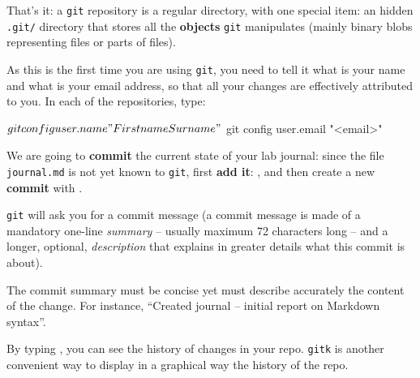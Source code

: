\documentclass{instructions}
\newcommand{\git}{\texttt{git}\xspace}
\begin{document}
That's it: a \git repository is a regular directory, with one
special item: an hidden \texttt{.git/} directory that stores all the
\textbf{objects} \git manipulates (mainly binary blobs representing files or
parts of files).


As this is the first time you are using \git, you need to tell it what is your
name and what is your email address, so that all your changes are
effectively attributed to you. In each of the repositories, type:

\begin{shcode}
$ git config user.name "Firstname Surname"
$ git config user.email "<email>"
\end{shcode}



We are going to \textbf{commit} the current state of your lab journal: since
the file \texttt{journal.md} is
not yet known to \git, first \textbf{add it}: , and
then create a new \textbf{commit} with .

\git will ask you for a
commit message (a commit message is made of a mandatory one-line \emph{summary} --
usually maximum 72 characters long -- and a longer, optional, \emph{description} that explains
in greater details what this commit is about).

The commit summary must be concise yet must describe accurately the content of
the change. For instance, ``Created journal -- initial report on Markdown syntax''.


By typing , you can see the
history of changes in your repo. \texttt{gitk} is another
convenient way to display in a graphical way the history of the repo.

\end{document}
